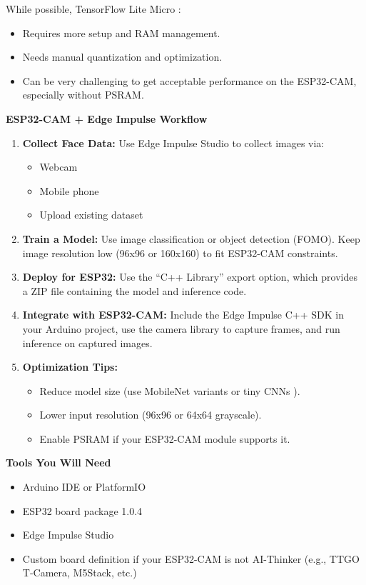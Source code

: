 While possible, TensorFlow Lite Micro \cite{Banbury:2021}:
\begin{itemize}
    \item Requires more setup and RAM management.
    \item Needs manual quantization and optimization.
    \item Can be very challenging to get acceptable performance on the ESP32-CAM, especially without PSRAM.
\end{itemize}

\textbf{ESP32-CAM + Edge Impulse Workflow}

\begin{enumerate}
    \item \textbf{Collect Face Data:} Use Edge Impulse Studio to collect images via:
    \begin{itemize}
        \item Webcam
        \item Mobile phone
        \item Upload existing dataset
    \end{itemize}
    \item \textbf{Train a Model:} Use image classification or object detection (FOMO). Keep image resolution low (96x96 or 160x160) to fit ESP32-CAM constraints.
    \item \textbf{Deploy for ESP32:} Use the ``C++ Library'' export option, which provides a ZIP file containing the model and inference code.
    \item \textbf{Integrate with ESP32-CAM:} Include the Edge Impulse C++ SDK in your Arduino project, use the camera library to capture frames, and run inference on captured images.
    \item \textbf{Optimization Tips:}
    \begin{itemize}
        \item Reduce model size (use MobileNet variants or tiny CNNs \cite{Howard:2017}).
        \item Lower input resolution (96x96 or 64x64 grayscale).
        \item Enable PSRAM if your ESP32-CAM module supports it.
    \end{itemize}
\end{enumerate}

\textbf{Tools You Will Need}

\begin{itemize}
    \item Arduino IDE or PlatformIO
    \item ESP32 board package 1.0.4
    \item Edge Impulse Studio
    \item Custom board definition if your ESP32-CAM is not AI-Thinker (e.g., TTGO T-Camera, M5Stack, etc.)
\end{itemize}

